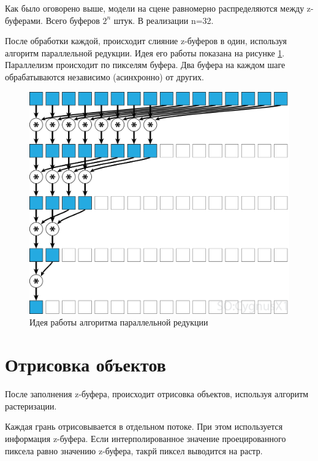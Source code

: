 Как было оговорено выше, модели на сцене равномерно распределяются между z-буферами. Всего буферов $ 2^n $ штук. В реализации n=32.

После обработки каждой, происходит слияние z-буферов в один, используя алгоритм параллельной редукции. Идея его работы показана на 
рисунке \ref{img:parallel_reduce}. Параллелизм происходит по пикселям буфера. Два буфера на каждом шаге обрабатываются независимо (асинхронно) от других.

\begin{figure}[H]
	\begin{center}
		\includegraphics[scale=0.3]{img/parallel_reduction.png}
	\end{center}
	\captionsetup{justification=centering}
	\caption{Идея работы алгоритма параллельной редукции}
	\label{img:parallel_reduce}
\end{figure}

\section{Отрисовка объектов}

После заполнения z-буфера, происходит отрисовка объектов, используя алгоритм растеризации.

Каждая грань отрисовывается в отдельном потоке. При этом используется информация z-буфера. Если интерполированное значение проецированного пиксела равно значению z-буфера,
такрй пиксел выводится на растр.

